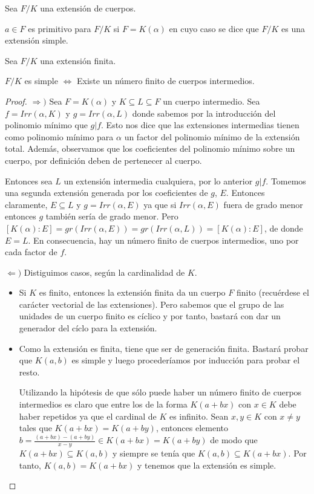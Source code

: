 \begin{definition}
Sea $F/K$ una extensión de cuerpos.

$a \in F$ es primitivo para $F/K$ si $F = K(\alpha)$ en cuyo caso se dice que $F/K$ es una extensión simple. 
\end{definition}

\begin{theorem}
Sea $F/K$ una extensión finita. 

$F/K$ es simple $\iff$ Existe un número finito de cuerpos intermedios. 
\end{theorem}
\begin{proof}
$\Rightarrow)$ Sea $F = K(\alpha)$ y $K \subseteq L \subseteq F$ un cuerpo intermedio. Sea $f = Irr(\alpha,K)$ y $g = Irr(\alpha,L)$ donde sabemos por la introducción del polinomio mínimo que $g|f$. Esto nos dice que las extensiones intermedias tienen como polinomio mínimo para $\alpha$ un factor del polinomio mínimo de la extensión total. Además, observamos que los coeficientes del polinomio mínimo sobre un cuerpo, por definición deben de pertenecer al cuerpo. 

Entonces sea  $L$ un extensión intermedia cualquiera, por lo anterior $g|f$. Tomemos una segunda extensión generada por los coeficientes de $g$, $E$. Entonces claramente, $E \subseteq L$ y $g = Irr(\alpha,E)$ ya que si $Irr(\alpha,E)$ fuera de grado menor entonces $g$ también sería de grado menor. Pero $[K(\alpha):E] = gr(Irr(\alpha,E)) = gr(Irr(\alpha,L)) = [K(\alpha):E]$, de donde $E = L$. En consecuencia, hay un número finito de cuerpos intermedios, uno por cada factor de $f$. 

$\Leftarrow)$ Distiguimos casos, según la cardinalidad de $K$. 

\begin{itemize}
\item Si $K$ es finito, entonces la extensión finita da un cuerpo $F$ finito (recuérdese el carácter vectorial de las extensiones). Pero sabemos que el grupo de las unidades de un cuerpo finito es cíclico y por tanto, bastará con dar un generador del cíclo para la extensión. 

\item Como la extensión es finita, tiene que ser de generación finita. Bastará probar que $K(a,b)$ es simple y luego procederíamos por inducción para probar el resto. 

Utilizando la hipótesis de que sólo puede haber un número finito de cuerpos intermedios es claro que entre los de la forma $K(a+bx)$ con $x \in K$ debe haber repetidos ya que el cardinal de $K$ es infinito. Sean $x,y \in K$ con $x \neq y$ tales que $K(a+bx) = K(a+by)$, entonces elemento $b = \frac{(a+bx)-(a+by)}{x-y} \in K(a+bx) = K(a+by)$ de modo que $K(a+bx) \subseteq K(a,b)$ y siempre se tenía que $K(a,b) \subseteq K(a+bx)$. Por tanto, $K(a,b) = K(a+bx)$ y tenemos que la extensión es simple. 
\end{itemize}
\end{proof}

